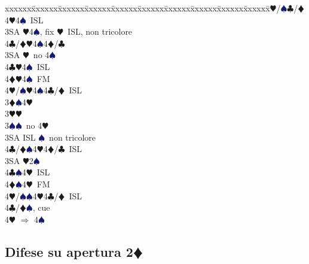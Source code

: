 \documentclass[a4paper,italian]{article}
\newcommand{\BC}{\textcolor{OliveGreen}{$\clubsuit$}}
\newcommand{\BD}{\textcolor{RedOrange}{$\vardiamondsuit$}}
\newcommand{\BH}{\textcolor{Red2}{$\varheartsuit${}}}
\newcommand{\BS}{\textcolor{MidnightBlue}{$\spadesuit${}}}
\newcommand{\pdfd}{\texorpdfstring{\BD{}}{D}}
\newenvironment{bidtable}
{\begin{tabbing}

    xxxxxx\=xxxxxx\=xxxxxx\=xxxxxx\=xxxxxx\=xxxxxx\=xxxxxx\=xxxxxx\=xxxxxx\=xxxxxx\=\kill}
{\end{tabbing} }%
\begin{document}
\begin{multicols}{2}
\begin{bidtable}
        4\BH/\BS {}\BC /\BD 4\BH 4\BS\ ISL\-\-\\
        3SA \BH 4\BS , fix \BH\ ISL, non tricolore\\
        4\BC/\BD {}\BH 4\BS 4\BD /\BC \-\\
        3SA \BH\ no 4\BS \+\\
        4\BC {}\BH 4\BS\ ISL\\
        4\BD {}\BH 4\BS\ FM\\
        4\BH/\BS {}\BH4\BS4\BC/\BD\ ISL\-\-\\
        3\BD {}\BS 4\BH \+\\
        3\BH {}\BH \\
        3\BS {}\BS\ no 4\BH \+\\
        3SA\> ISL \BS\ non tricolore\\
        4\BC/\BD {}\BS 4\BH 4\BD /\BC\ ISL\-\\
        3SA \BH 2\BS \+\\
        4\BC {}\BS 4\BH\ ISL\\
        4\BD {}\BS 4\BH\ FM\\
        4\BH/\BS {}\BS 4\BH 4\BC /\BD\ ISL \-\\
        4\BC/\BD {}\BS, cue\+\\
        4\BH \> $\Rightarrow$ 4\BS

    \end{bidtable}
\end{multicols}

\subsection{Difese su apertura 2\pdfd}
\end{document}
